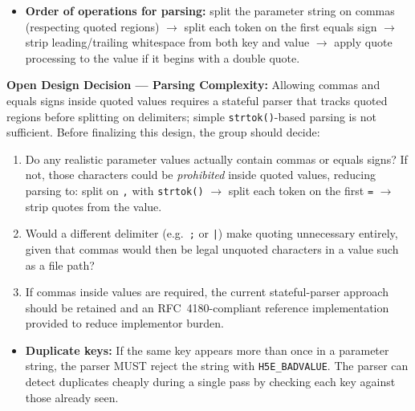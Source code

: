 \documentclass[../HDF5_RFC.tex]{subfiles}
\begin{document}
\begin{itemize}
  only outside of quotes). A literal double quote within a quoted value is
  represented as two consecutive double quotes (\texttt{""}), following the
  quoted-field escaping convention of RFC~4180~\cite{rfc4180}. An unbalanced quote
  (opening \texttt{"} with no closing \texttt{"}) MUST cause the parser to return
  \texttt{H5E\_BADVALUE} rather than silently consuming the rest of the string.
\item \textbf{Order of operations for parsing:} split the parameter string on commas
  (respecting quoted regions) $\rightarrow$ split each token on the first
  equals sign $\rightarrow$ strip leading/trailing whitespace from both key and
  value $\rightarrow$ apply quote processing to the value if it begins with a
  double quote.
\end{itemize}

\noindent\colorbox{yellow!25}{\parbox{\dimexpr\linewidth-2\fboxsep}{%
  \textbf{Open Design Decision --- Parsing Complexity:}
  Allowing commas and equals signs inside quoted values requires a stateful
  parser that tracks quoted regions before splitting on delimiters; simple
  \texttt{strtok()}-based parsing is not sufficient.
  Before finalizing this design, the group should decide:
  \begin{enumerate}
    \item Do any realistic parameter values actually contain commas or equals
          signs?  If not, those characters could be \emph{prohibited} inside
          quoted values, reducing parsing to: split on \texttt{,} with
          \texttt{strtok()} $\rightarrow$ split each token on the first
          \texttt{=} $\rightarrow$ strip quotes from the value.
    \item Would a different delimiter (e.g.\ \texttt{;} or \texttt{|}) make
          quoting unnecessary entirely, given that commas would then be legal
          unquoted characters in a value such as a file path?
    \item If commas inside values are required, the current stateful-parser
          approach should be retained and an RFC~4180-compliant reference
          implementation provided to reduce implementor burden.
  \end{enumerate}
}}

\begin{itemize}
\item \textbf{Duplicate keys:} If the same key appears more than once in a parameter
  string, the parser MUST reject the string with \texttt{H5E\_BADVALUE}. The parser
  can detect duplicates cheaply during a single pass by checking each key
  against those already seen.
\end{itemize}
\end{document}
